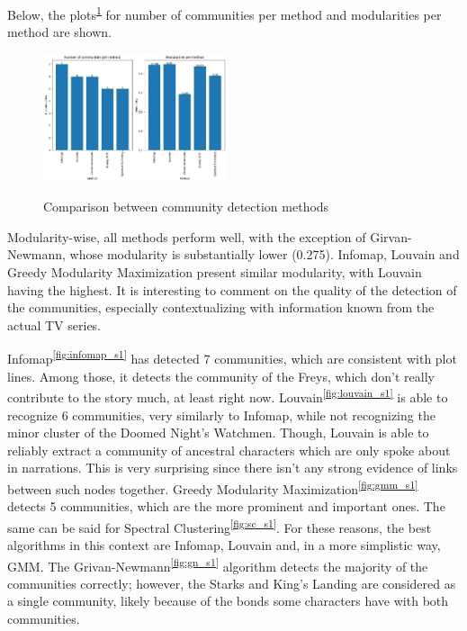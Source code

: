 \documentclass[10pt,twocolumn,letterpaper]{article}
\begin{document}
Below, the plots\textsuperscript{\ref{fig:comm_comp_s1}} for number of communities per method and modularities per method are shown. 

\begin{figure}[!h]
    \centering
    \includegraphics[width=0.48\textwidth]{img/s1/communities_comparison.jpg}\\
    \label{fig:comm_comp_s1}
    \caption{\small{Comparison between community detection methods}}
\end{figure}

Modularity-wise, all methods perform well, with the exception of Girvan-Newmann, whose modularity is substantially lower (0.275). Infomap, Louvain and Greedy Modularity Maximization present similar modularity, with Louvain having the highest. 
It is interesting to comment on the quality of the detection of the communities, especially contextualizing with information known from the actual TV series. 

Infomap\textsuperscript{\ref{fig:infomap_s1}} has detected 7 communities, which are consistent with plot lines. Among those, it detects the community of the Freys, which don't really contribute to the story much, at least right now. Louvain\textsuperscript{\ref{fig:louvain_s1}} is able to recognize 6 communities, very similarly to Infomap, while not recognizing the minor cluster of the Doomed Night's Watchmen. Though, Louvain is able to reliably extract a community of ancestral characters which are only spoke about in narrations. This is very surprising since there isn't any strong evidence of links between such nodes together. Greedy Modularity Maximization\textsuperscript{\ref{fig:gmm_s1}} detects 5 communities, which are the more prominent and important ones. The same can be said for Spectral Clustering\textsuperscript{\ref{fig:sc_s1}}.
For these reasons, the best algorithms in this context are Infomap, Louvain and, in a more simplistic way, GMM. 
The Grivan-Newmann\textsuperscript{\ref{fig:gn_s1}} algorithm detects the majority of the communities correctly; however, the Starks and King's Landing are considered as a single community, likely because of the bonds some characters have with both communities.
\end{document}
